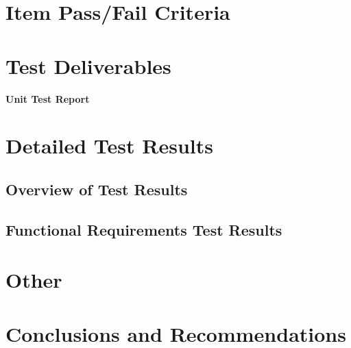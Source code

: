 \documentclass[a4paper,12pt]{article}
\begin{document}
\section{Item Pass/Fail Criteria}

\section{Test Deliverables}

\newpage

\begin{center}
	\huge \bfseries Unit Test Report \\[2cm]
\end{center}

\section{Detailed Test Results}
\subsection{Overview of Test Results}
\subsection{Functional Requirements Test Results}

\section{Other}

\section{Conclusions and Recommendations}

%
%
\end{document}
